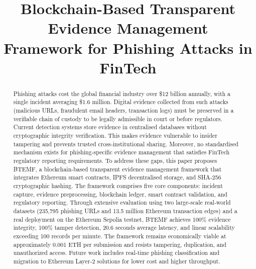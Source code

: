 \documentclass[conference]{IEEEtran}
\begin{document}
\title{Blockchain-Based Transparent Evidence Management\\
Framework for Phishing Attacks in FinTech}

\author{
}

\maketitle

\begin{abstract}
Phishing attacks cost the global financial industry over \$12 billion annually, with a single incident averaging \$1.6 million. Digital evidence collected from such attacks (malicious URLs, fraudulent email headers, transaction logs) must be preserved in a verifiable chain of custody to be legally admissible in court or before regulators. Current detection systems store evidence in centralised databases without cryptographic integrity verification. This makes evidence vulnerable to insider tampering and prevents trusted cross‑institutional sharing. Moreover, no standardised mechanism exists for phishing‑specific evidence management that satisfies FinTech regulatory reporting requirements. To address these gaps, this paper proposes BTEMF, a blockchain‑based transparent evidence management framework that integrates Ethereum smart contracts, IPFS decentralised storage, and SHA‑256 cryptographic hashing. The framework comprises five core components: incident capture, evidence preprocessing, blockchain ledger, smart contract validation, and regulatory reporting. Through extensive evaluation using two large‑scale real‑world datasets (235,795 phishing URLs and 13.5 million Ethereum transaction edges) and a real deployment on the Ethereum Sepolia testnet, BTEMF achieves 100\% evidence integrity, 100\% tamper detection, 20.6 seconds average latency, and linear scalability exceeding 100 records per minute. The framework remains economically viable at approximately 0.001 ETH per submission and resists tampering, duplication, and unauthorized access. Future work includes real‑time phishing classification and migration to Ethereum Layer‑2 solutions for lower cost and higher throughput.
\end{abstract}
\end{document}
